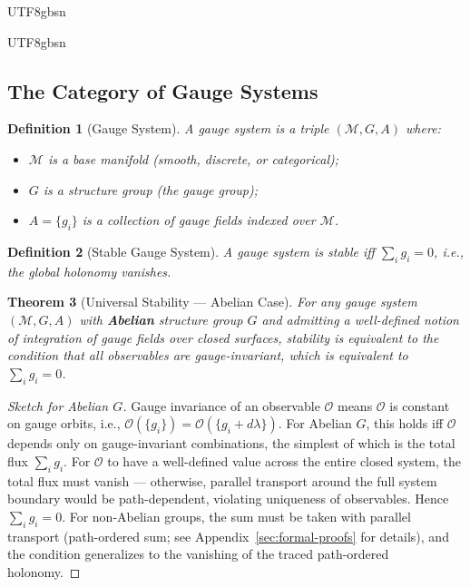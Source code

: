 \documentclass[11pt,a4paper]{article}
\newtheorem{theorem}{Theorem}[section]
\newtheorem{definition}[theorem]{Definition}
\newcommand{\Manifold}{\mathcal{M}}
\begin{document}
\begin{CJK}{UTF8}{gbsn}
{\begin{CJK}{UTF8}{gbsn}
\subsection{The Category of Gauge Systems}
\begin{definition}[Gauge System]
A \textit{gauge system} is a triple $(\Manifold, G, A)$ where:
\begin{itemize}
    \item $\Manifold$ is a base manifold (smooth, discrete, or categorical);
    \item $G$ is a structure group (the gauge group);
    \item $A = \{g_i\}$ is a collection of gauge fields indexed over $\Manifold$.
\end{itemize}
\end{definition}
\begin{definition}[Stable Gauge System]
A gauge system is \textit{stable} iff $\sum_i g_i = 0$, i.e., the global holonomy vanishes.
\end{definition}
\begin{theorem}[Universal Stability --- Abelian Case]
\label{thm:universal}
For any gauge system $(\Manifold, G, A)$ with \textbf{Abelian} structure group $G$
and admitting a well-defined notion of integration of gauge fields over closed
surfaces, stability is equivalent to the condition that all observables are
gauge-invariant, which is equivalent to $\sum_i g_i = 0$.
\end{theorem}
\begin{proof}[Sketch for Abelian $G$]
Gauge invariance of an observable $\mathcal{O}$ means $\mathcal{O}$ is constant on gauge
orbits, i.e., $\mathcal{O}(\{g_i\}) = \mathcal{O}(\{g_i + d\lambda\})$. For Abelian $G$,
this holds iff $\mathcal{O}$ depends only on gauge-invariant combinations, the simplest
of which is the total flux $\sum_i g_i$. For $\mathcal{O}$ to have a well-defined value
across the entire closed system, the total flux must vanish --- otherwise, parallel
transport around the full system boundary would be path-dependent, violating uniqueness
of observables. Hence $\sum_i g_i = 0$.
For non-Abelian groups, the sum must be taken with parallel transport (path-ordered sum;
see Appendix~\ref{sec:formal-proofs} for details), and the condition generalizes to the
vanishing of the traced path-ordered holonomy.
\end{proof}

\end{CJK}}
\end{CJK}
\end{document}
